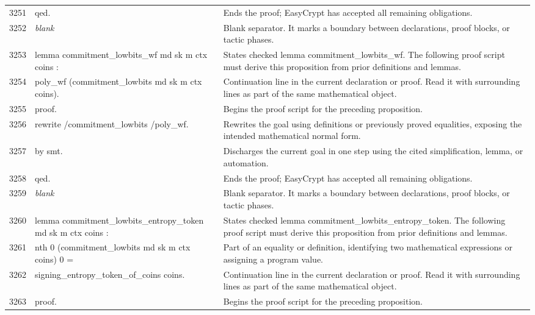 \documentclass[10pt]{article}
\begin{document}
\begin{longtable}{r L{0.53\textwidth} L{0.37\textwidth}}
3251 & {\ttfamily\scriptsize qed.} & Ends the proof; EasyCrypt has accepted all remaining obligations. \\
3252 & {\ttfamily\scriptsize \emph{blank}} & Blank separator.  It marks a boundary between declarations, proof blocks, or tactic phases. \\
3253 & {\ttfamily\scriptsize lemma commitment\_lowbits\_wf md sk m ctx coins :} & States checked lemma commitment\_lowbits\_wf.  The following proof script must derive this proposition from prior definitions and lemmas. \\
3254 & {\ttfamily\scriptsize   poly\_wf (commitment\_lowbits md sk m ctx coins).} & Continuation line in the current declaration or proof.  Read it with surrounding lines as part of the same mathematical object. \\
3255 & {\ttfamily\scriptsize proof.} & Begins the proof script for the preceding proposition. \\
3256 & {\ttfamily\scriptsize rewrite /commitment\_lowbits /poly\_wf.} & Rewrites the goal using definitions or previously proved equalities, exposing the intended mathematical normal form. \\
3257 & {\ttfamily\scriptsize by smt.} & Discharges the current goal in one step using the cited simplification, lemma, or automation. \\
3258 & {\ttfamily\scriptsize qed.} & Ends the proof; EasyCrypt has accepted all remaining obligations. \\
3259 & {\ttfamily\scriptsize \emph{blank}} & Blank separator.  It marks a boundary between declarations, proof blocks, or tactic phases. \\
3260 & {\ttfamily\scriptsize lemma commitment\_lowbits\_entropy\_token md sk m ctx coins :} & States checked lemma commitment\_lowbits\_entropy\_token.  The following proof script must derive this proposition from prior definitions and lemmas. \\
3261 & {\ttfamily\scriptsize   nth 0 (commitment\_lowbits md sk m ctx coins) 0 =} & Part of an equality or definition, identifying two mathematical expressions or assigning a program value. \\
3262 & {\ttfamily\scriptsize   signing\_entropy\_token\_of\_coins coins.} & Continuation line in the current declaration or proof.  Read it with surrounding lines as part of the same mathematical object. \\
3263 & {\ttfamily\scriptsize proof.} & Begins the proof script for the preceding proposition. \\

\end{longtable}
\end{document}
